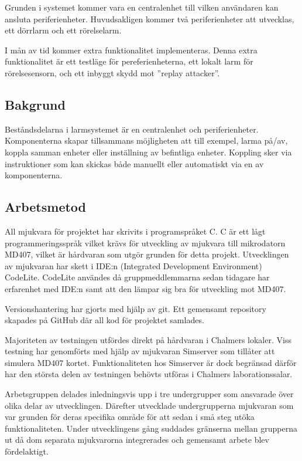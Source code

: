 \documentclass[a4paper]{article}
\begin{document}
Grunden i systemet kommer vara en centralenhet till vilken användaren kan ansluta periferienheter. Huvudsakligen kommer två periferienheter att utvecklas, ett dörrlarm och ett rörelselarm.

I mån av tid kommer extra funktionalitet implementeras. Denna extra funktionalitet är ett testläge för pereferienheterna, ett lokalt larm för rörelsesensorn, och ett inbyggt skydd mot ''replay attacker''.

\subsection{Bakgrund}

Beståndsdelarna i larmsystemet är en centralenhet och periferienheter. Komponenterna skapar tillsammans möjligheten att till exempel, larma på/av, koppla samman enheter eller inställning av befintliga enheter. Koppling sker via instruktioner som kan skickas både manuellt eller automatiskt via en av komponenterna.

\subsection{Arbetsmetod}

All mjukvara för projektet har skrivits i programspråket C. C är ett lågt programmeringsspråk vilket krävs för utveckling av mjukvara till mikrodatorn MD407, vilket är hårdvaran som utgör grunden för detta projekt. Utvecklingen av mjukvaran har skett i IDE:n (Integrated Development Environment) CodeLite. CodeLite användes då gruppmeddlemmarna sedan tidagare har erfarenhet med IDE:n samt att den lämpar sig bra för utveckling mot MD407.

Versionshantering har gjorts med hjälp av git. Ett gemensamt repository skapades på GitHub där all kod för projektet samlades.

Majoriteten av testningen utfördes direkt på hårdvaran i Chalmers lokaler. Viss testning har genomförts med hjälp av mjukvaran Simserver som tillåter att simulera MD407 kortet. Funktionaliteten hos Simserver är dock begränsad därför har den största delen av testningen behövts utföras i Chalmers laborationssalar.

Arbetsgruppen delades inledningsvis upp i tre undergrupper som ansvarade över olika delar av utvecklingen. Därefter utvecklade undergrupperna mjukvaran som var grunden för deras specifika område för att sedan i små steg utöka funktionaliteten. Under utvecklingens gång suddades gränserna mellan grupperna ut då dom separata mjukvarorna integrerades och gemensamt arbete blev fördelaktigt.
\end{document}
